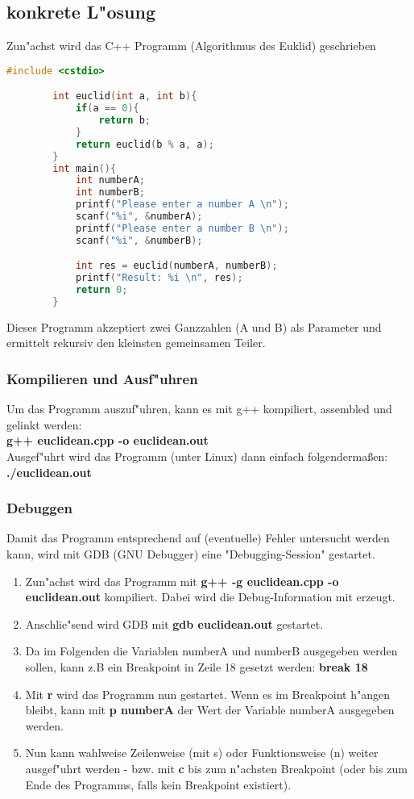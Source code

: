 \documentclass[a4paper,11pt,titlepage]{article}
\begin{document}
    \subsection{konkrete L"osung}
    Zun"achst wird das C++ Programm (Algorithmus des Euklid) geschrieben \\
    \begin{lstlisting}[language=C++, caption=euclidean.cpp]
        #include <cstdio>

        int euclid(int a, int b){
            if(a == 0){
                return b;
            }
            return euclid(b % a, a);
        }
        int main(){
            int numberA;
            int numberB;
            printf("Please enter a number A \n");
            scanf("%i", &numberA);
            printf("Please enter a number B \n");
            scanf("%i", &numberB);

            int res = euclid(numberA, numberB);
            printf("Result: %i \n", res);
            return 0;
        }
    \end{lstlisting}

    Dieses Programm akzeptiert zwei Ganzzahlen (A und B) als Parameter und ermittelt rekursiv den kleinsten gemeinsamen Teiler.

    \subsubsection*{Kompilieren und Ausf"uhren}
    Um das Programm auszuf"uhren, kann es mit g++ kompiliert, assembled und gelinkt werden: \\
    \textbf{g++ euclidean.cpp -o euclidean.out} \\
    Ausgef"uhrt wird das Programm (unter Linux) dann einfach folgendermaßen: \textbf{./euclidean.out}

    \subsubsection{Debuggen}
    Damit das Programm entsprechend auf (eventuelle) Fehler untersucht werden kann, wird mit GDB (GNU Debugger) eine "Debugging-Session" gestartet.
    \begin{enumerate}
        \item Zun"achst wird das Programm mit \textbf{g++ -g euclidean.cpp -o euclidean.out} kompiliert. Dabei wird die Debug-Information mit erzeugt.
        \item Anschlie"send wird GDB mit \textbf{gdb euclidean.out} gestartet.
        \item Da im Folgenden die Variablen numberA und numberB ausgegeben werden sollen, kann z.B ein Breakpoint in Zeile 18 gesetzt werden: \textbf{break 18}
        \item Mit \textbf{r} wird das Programm nun gestartet. Wenn es im Breakpoint h"angen bleibt, kann mit \textbf{p numberA} der Wert der Variable numberA ausgegeben werden.
        \item Nun kann wahlweise Zeilenweise (mit s) oder Funktionsweise (n) weiter ausgef"uhrt werden - bzw. mit \textbf{c} bis zum n"achsten Breakpoint (oder bis zum Ende des Programms, falls kein Breakpoint existiert).
    \end{enumerate}
\end{document}
